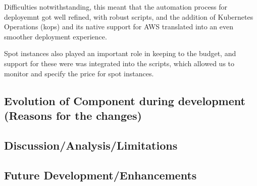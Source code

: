 Difficulties notwithstanding, this meant that the automation process for
deployemnt got well refined, with robust scripts, and the addition of
Kubernetes Operations (kops) and its native support for AWS translated
into an even smoother deployment experience.

Spot instances also played an important role in keeping to the budget,
and support for these were was integrated into the scripts, which
allowed us to monitor and specify the price for spot instances.

\subsection{Evolution of Component during development (Reasons for the
changes)}\label{evolution-of-component-during-development-reasons-for-the-changes}

\subsection{Discussion/Analysis/Limitations}\label{discussionanalysislimitations}

\subsection{Future
Development/Enhancements}\label{future-developmentenhancements}
